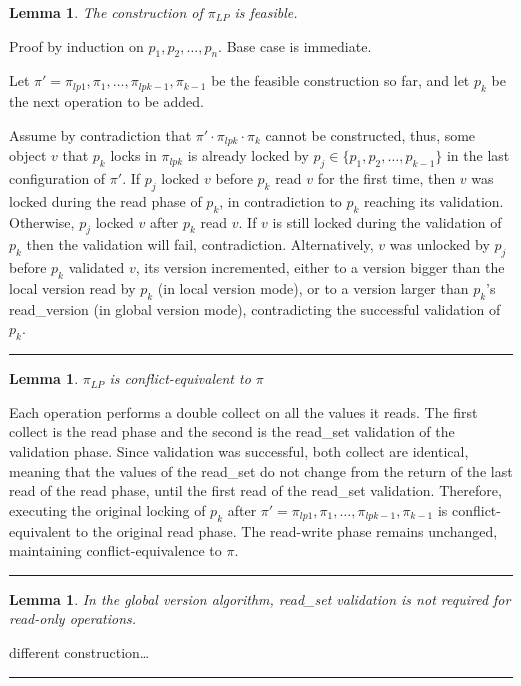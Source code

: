\documentclass{article}
\newtheorem{lemma}[theorem]{Lemma}
\newenvironment{proof}[1][Proof]{\begin{trivlist}
\item[\hskip \labelsep {\bfseries #1}]}{\qedsymb\end{trivlist}}
\newcommand{\qedsymb}{\hfill{\rule{2mm}{2mm}}}
\newcommand{\code}[1]{\textsf{#1}}
\newcommand{\readV}{\code{read\_version}\xspace}
\newcommand{\readSet}{\code{read\_set}\xspace}
\begin{document}
\begin{lemma}
The construction of $\pi_{LP}$ is feasible.  
\end{lemma}
\begin{proof}
Proof by induction on $p_1,p_2,\ldots,p_n$. Base case is immediate. 

Let $\pi' = \pi_{lp1},\pi_{1},\ldots,\pi_{lpk-1},\pi_{k-1}$ be the feasible
construction so far, and let $p_{k}$ be the next operation to be 
added. 

Assume by contradiction that $\pi'\cdot\pi_{lpk}\cdot\pi_{k}$ 
cannot be constructed, thus, some object $v$ that $p_{k}$ locks 
in $\pi_{lpk}$ is already locked 
by $p_j \in \{p_1,p_2,\ldots,p_{k-1}\}$ in
the last configuration of $\pi'$. 
If $p_j$ locked $v$ before $p_k$ read $v$ for the first time, 
then $v$ was locked during the read phase of $p_k$, 
in contradiction to $p_k$ reaching its validation. 
Otherwise, $p_j$ locked $v$ after $p_k$ read $v$. 
If $v$ is still locked during the validation of $p_k$ then 
the validation will fail, contradiction. Alternatively, $v$ 
was unlocked by $p_j$ before $p_k$ validated $v$, 
its version incremented, either to a version bigger 
than the local version read by $p_k$ (in local version mode), 
or to a version larger than $p_k$'s \readV 
(in global version mode), contradicting the successful 
validation of $p_k$.  
\end{proof}

\begin{lemma}
$\pi_{LP}$ is conflict-equivalent to $\pi$
\end{lemma}
\begin{proof}
Each operation performs a double collect on all the values it reads. 
The first collect is the read phase and the second is the \readSet 
validation of the validation phase. Since validation was successful, 
both collect are identical, meaning that the values of the \readSet
do not change from the return of the last read of the read phase,
until the first read of the \readSet validation. Therefore, executing 
the original locking of $p_k$ after $\pi' =
\pi_{lp1},\pi_{1},\ldots,\pi_{lpk-1},\pi_{k-1}$ is conflict-equivalent
to the original read phase. The read-write phase remains unchanged, 
maintaining conflict-equivalence to $\pi$.
\end{proof}

\begin{lemma}
In the global version algorithm, \readSet validation is not required
for read-only operations. 
\end{lemma}
\begin{proof}
different construction\ldots
\end{proof}




\end{document}
